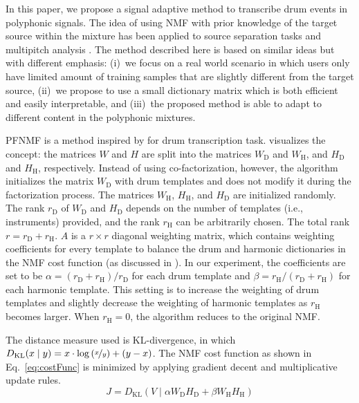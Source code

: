 \documentclass{article}
\begin{document}
In this paper, %
we propose a signal adaptive method to transcribe drum events in polyphonic signals. The idea of using NMF with prior knowledge of the target source within the mixture has been applied to source separation tasks \cite{smaragdis_ssnmf_2007} and multipitch analysis \cite{raczynski_Hnmf_2007}. The method described here is based on similar ideas but with different emphasis: 
(i)~we focus on a real world scenario in which users only have limited amount of training samples that are slightly different from the target source, 
(ii)~we propose to use a small dictionary matrix which is both efficient and easily interpretable, and
(iii)~the proposed method is able to adapt to different content in the polyphonic mixtures.

PFNMF\cite{Wu2015} is a method inspired by \cite{yoo_nonnegative_2010} for drum transcription task.  visualizes the concept: the matrices $W$ and $H$ are split into the  matrices $W_\mathrm{D}$ and $W_\mathrm{H}$, and  $H_\mathrm{D}$ and $H_\mathrm{H}$, respectively. Instead of using co-factorization, however, the algorithm initializes the matrix $W_\mathrm{D}$ with drum templates and does not modify it during the factorization process. The matrices $W_\mathrm{H}$, $H_\mathrm{H}$, and $H_\mathrm{D}$ are initialized randomly. The rank $r_\mathrm{D}$ of $W_\mathrm{D}$ and $H_\mathrm{D}$ depends on the number of templates (i.e., instruments) provided, and the rank $r_\mathrm{H}$ can be arbitrarily chosen. The total rank $r = r_\mathrm{D} + r_\mathrm{H}$. $A$ is a $r \times r$ diagonal weighting matrix, which contains weighting coefficients for every template to balance the drum and harmonic dictionaries in the NMF cost function (as discussed in ). In our experiment, the coefficients are set to be $\alpha = (r_\mathrm{D} + r_\mathrm{H})/ r_\mathrm{D}$ for each drum template and $\beta = r_\mathrm{H}/ (r_\mathrm{D} + r_\mathrm{H})$ for each harmonic template. This setting is to increase the weighting of drum templates and slightly decrease the weighting of harmonic templates as $r_\mathrm{H}$ becomes larger. When $r_\mathrm{H} = 0$, the algorithm reduces to the original NMF.

The distance measure used is KL-divergence, in which \(D_\mathrm{KL}(x \mid y) = x\cdot\log\left(\nicefrac{x}{y}\right) + (y - x)\). %
The NMF cost function as shown in Eq.~\eqref{eq:costFunc} is minimized by applying gradient decent and multiplicative update rules. 
\begin{equation}
\label{eq:costFunc}
J = D_\mathrm{KL}(V \mid \alpha W_\mathrm{D}H_\mathrm{D} + \beta W_\mathrm{H}H_\mathrm{H})
\end{equation}
\end{document}
